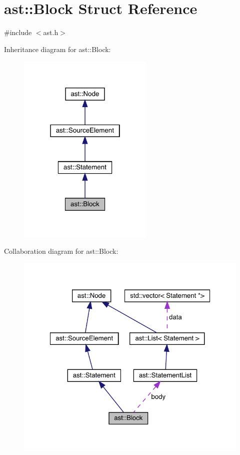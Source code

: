 \hypertarget{structast_1_1_block}{}\section{ast\+:\+:Block Struct Reference}
\label{structast_1_1_block}


{\ttfamily \#include $<$ast.\+h$>$}



Inheritance diagram for ast\+:\+:Block\+:
\nopagebreak
\begin{figure}[H]
\begin{center}
\leavevmode
\includegraphics[width=183pt]{structast_1_1_block__inherit__graph}
\end{center}
\end{figure}


Collaboration diagram for ast\+:\+:Block\+:
\nopagebreak
\begin{figure}[H]
\begin{center}
\leavevmode
\includegraphics[width=322pt]{structast_1_1_block__coll__graph}
\end{center}
\end{figure}
